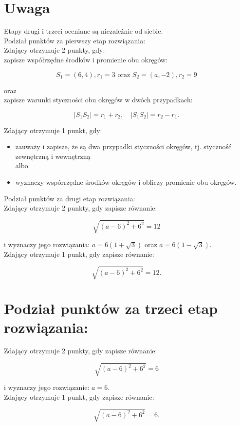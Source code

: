 \documentclass[10pt]{article}
\begin{document}
\section*{Uwaga}
Etapy drugi i trzeci oceniane są niezależnie od siebie.\\
Podział punktów za pierwszy etap rozwiązania:\\
Zdający otrzymuje 2 punkty, gdy:\\
zapisze współrzędne środków i promienie obu okręgów:

$$
S_{1}=(6,4), r_{1}=3 \text { oraz } S_{2}=(a,-2), r_{2}=9
$$

oraz\\
zapisze warunki styczności obu okręgów w dwóch przypadkach:

$$
\left|S_{1} S_{2}\right|=r_{1}+r_{2}, \quad\left|S_{1} S_{2}\right|=r_{2}-r_{1} .
$$

Zdający otrzymuje 1 punkt, gdy:

\begin{itemize}
  \item zauważy i zapisze, że są dwa przypadki styczności okręgów, tj. styczność zewnętrzną i wewnętrzną\\
albo
  \item wyznaczy wspórrzędne środków okręgów i obliczy promienie obu okręgów.
\end{itemize}

Podział punktów za drugi etap rozwiązania:\\
Zdający otrzymuje 2 punkty, gdy zapisze równanie:

$$
\sqrt{(a-6)^{2}+6^{2}}=12
$$

i wyznaczy jego rozwiązania: $a=6(1+\sqrt{3})$ oraz $a=6(1-\sqrt{3})$.\\
Zdający otrzymuje 1 punkt, gdy zapisze równanie:

$$
\sqrt{(a-6)^{2}+6^{2}}=12 .
$$

\section*{Podział punktów za trzeci etap rozwiązania:}
Zdający otrzymuje 2 punkty, gdy zapisze równanie:

$$
\sqrt{(a-6)^{2}+6^{2}}=6
$$

i wyznaczy jego rozwiązanie: $a=6$.\\
Zdający otrzymuje 1 punkt, gdy zapisze równanie:

$$
\sqrt{(a-6)^{2}+6^{2}}=6 .
$$
\end{document}
